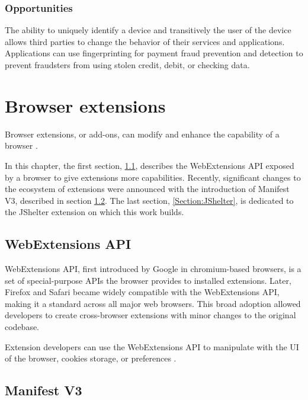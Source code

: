 \subsection{Opportunities}

The ability to uniquely identify a device and transitively the user of the device allows third parties to change the behavior of their services and applications. Applications can use fingerprinting for payment fraud prevention and detection \cite{FingerprintJSUseCases} to prevent fraudsters from using stolen credit, debit, or checking data.


\chapter{Browser extensions}
\label{Chapter:Extensions}

Browser extensions, or add-ons, can modify and enhance the capability of a browser \cite{MDNWebExtensions}.

In this chapter, the first section, \ref{Section:WebExtensionsAPI}, describes the WebExtensions API exposed by a browser to give extensions more capabilities. Recently, significant changes to the ecosystem of extensions were announced with the introduction of Manifest V3, described in section \ref{Section:ManifestV3}. The last section, \ref{Section:JShelter}, is dedicated to the JShelter extension on which this work builds.

\section{WebExtensions API}
\label{Section:WebExtensionsAPI}

WebExtensions API, first introduced by Google in chromium-based browsers, is a set of special-purpose APIs the browser provides to installed extensions. Later, Firefox \cite{MDNWebExtensions} and Safari \cite{AppleSafariWebExtensions} became widely compatible with the WebExtensions API, making it a standard across all major web browsers. This broad adoption allowed developers to create cross-browser extensions with minor changes to the original codebase.

Extension developers can use the WebExtensions API to manipulate with the UI of the browser, cookies storage, or preferences \cite{ChromeWebExtensionsAPIReference}.

\section{Manifest V3}
\label{Section:ManifestV3}


